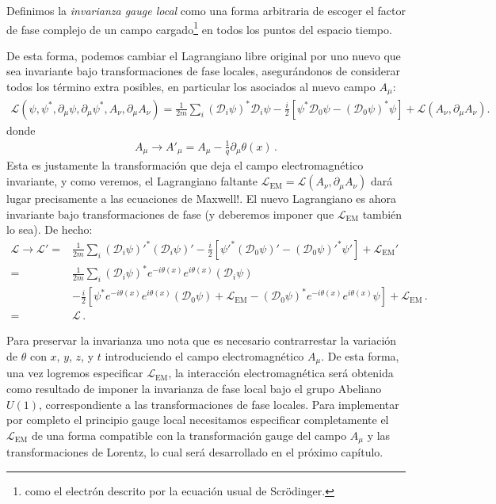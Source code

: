 Definimos la \emph{invarianza gauge local} como una forma arbitraria de escoger el factor de fase complejo de un campo cargado\footnote{como el electrón descrito por la ecuación usual de  Scrödinger.} en todos los puntos del espacio tiempo.

De esta forma, podemos cambiar el Lagrangiano libre original por uno nuevo que sea invariante bajo transformaciones de fase locales, asegurándonos de considerar todos los término extra posibles, en particular los asociados al nuevo campo $A_{\mu}$:
\begin{align}
   \mathcal{L}(\psi,\psi^*,\partial_\mu\psi,\partial_\mu\psi^*,A_\nu,\partial_{\mu} A_{\nu} )
=\frac{1}{2m}\sum_i\left(\mathcal{D}_i\psi\right)^*\mathcal{D}_i\psi-\frac{i}{2}
  \left[\psi^*\mathcal{D}_0\psi-\left(\mathcal{D}_0\psi\right)^*\psi\right]+\mathcal{L}\left( A_{\nu},\partial_{\mu} A_{\nu} \right).
\end{align}
donde
\begin{align}
\label{eq:167qft}
  A_\mu\to A'_\mu=A_\mu-\frac{1}{q}\partial_\mu\theta(x)\,.
\end{align}
Esta es justamente la transformación que deja el campo electromagnético invariante, y como veremos, el Lagrangiano faltante $\mathcal{L}_{\text{EM}}=\mathcal{L}\left( A_{\nu},\partial_{\mu} A_{\nu} \right)$ dará lugar precisamente a las ecuaciones de Maxwell!. El nuevo Lagrangiano es ahora invariante bajo transformaciones de fase (y deberemos imponer que $\mathcal{L}_{\text{EM}}$ también lo sea). De hecho:
\begin{align}
  \mathcal{L}\to \mathcal{L}'=&
\frac{1}{2m}\sum_i{\left(\mathcal{D}_i\psi\right)'}^*\left(\mathcal{D}_i\psi\right)'
-\frac{i}{2}\left[{\psi'}^*\left(\mathcal{D}_0\psi\right)'-{\left(\mathcal{D}_0\psi\right)'}^*\psi'\right]+\mathcal{L}_{\text{EM}}'\nonumber\\
=&
\frac{1}{2m}\sum_i{\left(\mathcal{D}_i\psi\right)}^*e^{-i\theta(x)}e^{i\theta(x)}\left(\mathcal{D}_i\psi\right)\nonumber\\
&-\frac{i}{2}\left[{\psi}^*e^{-i\theta(x)}e^{i\theta(x)}\left(\mathcal{D}_0\psi\right)+\mathcal{L}_{\text{EM}}
-{\left(\mathcal{D}_0\psi\right)}^*e^{-i\theta(x)}e^{i\theta(x)}\psi\right]+\mathcal{L}_{\text{EM}}\,.\nonumber\\
=&\mathcal{L}\,.
\end{align}

Para preservar la invarianza uno nota que es necesario contrarrestar la variación de  $\theta$ con $x$, $y$, $z$, y $t$ 
introduciendo el campo electromagnético  $A_\mu$. De esta forma, una vez logremos especificar $\mathcal{L}_{\text{EM}}$, la interacción electromagnética será obtenida como resultado de imponer la invarianza de fase local bajo el grupo Abeliano  $U(1)$, correspondiente a las transformaciones de fase locales. Para implementar por completo el principio gauge local necesitamos especificar completamente el $\mathcal{L}_{\text{EM}}$ de una forma compatible con la transformación gauge del campo $A_{\mu}$ y las transformaciones de Lorentz, lo cual será desarrollado en el próximo capítulo. 

